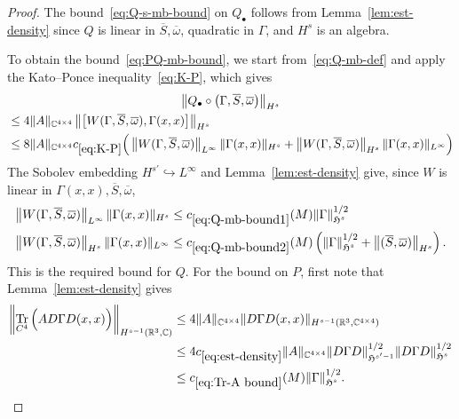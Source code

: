 \documentclass[10pt]{amsart}
\theoremstyle{definition}\newtheorem{defi}[theo]{Definition}\newtheorem{rema}[theo]{Remark}\newtheorem{exam}[theo]{Example}\newtheorem{exem}[theo]{Example}\newtheorem{nota}[theo]{Notation}
\DeclareMathOperator{\tr}{Tr}
\newcommand\R{\mathbb{R}}
\newcommand\C{\mathbb{C}}
\newcommand{\gH}{\mathfrak{H}}
\begin{document}
\begin{proof}
The bound~\eqref{eq:Q-s-mb-bound} on $Q_\bullet$ follows from Lemma~\ref{lem:est-density} since $Q$ is linear in $\overline{S}, \overline{\omega}$, quadratic in $\Gamma$, and $H^s$ is an algebra.

To obtain the bound~\eqref{eq:PQ-mb-bound}, we start from~\eqref{eq:Q-mb-def} and apply the Kato--Ponce inequality~\eqref{eq:K-P}, which gives
\begin{multline*}
\left\|Q_\bullet\circ\left(\Gamma, \overline{S}, \overline{\omega}\right)\right\|_{H^s}\\
\begin{aligned}
&\leq 4 \|A\|_{\C^{4\times 4}} \left\|\left[W(\Gamma, \overline{S}, \overline{\omega}),\Gamma(x,x)\right]\right\|_{H^s} \\
&\leq 8 \|A\|_{\C^{4\times 4}} c_{\eqref{eq:K-P}}
\Big(\left\|W(\Gamma, \overline{S}, \overline{\omega})\right\|_{L^\infty} \|\Gamma(x,x)\|_{H^s} 
+ \left\|W(\Gamma, \overline{S}, \overline{\omega})\right\|_{H^s}\|\Gamma(x,x)\|_{L^\infty}\Big)
\end{aligned}
\end{multline*}
The Sobolev embedding $H^{s'}\hookrightarrow L^\infty$ and Lemma~\ref{lem:est-density} give, since $W$ is linear in $\Gamma(x,x), \overline{S}, \overline{\omega}$,
\begin{align}
\left\|W(\Gamma, \overline{S}, \overline{\omega})\right\|_{L^\infty} \|\Gamma(x,x)\|_{H^s} &\leq c_{\eqref{eq:Q-mb-bound1}}(M)\|\Gamma\|_{\gH^{s}}^{1/2} \label{eq:Q-mb-bound1}
\\
\left\|W(\Gamma, \overline{S}, \overline{\omega})\right\|_{H^s}\|\Gamma(x,x)\|_{L^\infty} &\leq c_{\eqref{eq:Q-mb-bound2}}(M)\left(\|\Gamma\|_{\gH^{s}}^{1/2} + \left\|(\overline{S}, \overline{\omega})\right\|_{H^s}\right)\label{eq:Q-mb-bound2}
.
\end{align}
This is the required bound for $Q$. For the bound on $P$, first note that Lemma~\ref{lem:est-density} gives
\begin{equation}\label{eq:Tr-A bound}
\begin{split}
\left\|\tr_{C^4}\Big(A D \Gamma D(x,x)\Big)\right\|_{H^{s-1}\left(\R^3,\C\right)} &\leq 4 \|A\|_{\C^{4\times 4}}\|D \Gamma D(x,x)\|_{H^{s-1}\left(\R^3, \C^{4\times 4}\right)} \\
&\leq 4 c_{\eqref{eq:est-density}} \|A\|_{\C^{4\times 4}} \|D \Gamma D\|_{\gH^{s'-1}}^{1/2}\|D \Gamma D\|_{\gH^{s}}^{1/2}\\
&\leq c_{\eqref{eq:Tr-A bound}}(M) \|\Gamma \|_{\gH^{s}}^{1/2} 
.
\end{split}

\end{equation}
\end{proof}
\end{document}
